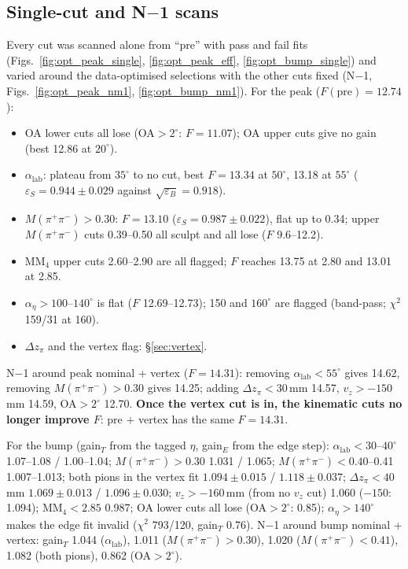 \documentclass[11pt,a4paper]{article}
\newcommand{\Mpipi}{\ensuremath{M(\pi^{+}\pi^{-})}\xspace}
\newcommand{\MMfour}{\ensuremath{\mathrm{MM}_4}\xspace}
\newcommand{\dzpi}{\ensuremath{\Delta z_\pi}\xspace}
\newcommand{\alab}{\ensuremath{\alpha_{\mathrm{lab}}}\xspace}
\newcommand{\aeta}{\ensuremath{\alpha_\eta}\xspace}
\newcommand{\vz}{\ensuremath{v_z}\xspace}
\begin{document}
\subsection{\texorpdfstring{Single-cut and N$-$1 scans}{Single-cut and N-1 scans}}
\label{sec:scans}
Every cut was scanned alone from ``pre'' with pass and fail fits (Figs.~\ref{fig:opt_peak_single},
\ref{fig:opt_peak_eff}, \ref{fig:opt_bump_single}) and varied around the data-optimised selections with the other
cuts fixed (N$-$1, Figs.~\ref{fig:opt_peak_nm1}, \ref{fig:opt_bump_nm1}). For the peak ($F(\mathrm{pre})=12.74$):
\begin{itemize}
\setlength{\itemsep}{0pt}
\item OA lower cuts all lose (OA$>2^\circ$: $F=11.07$); OA upper cuts give no gain (best 12.86 at
      $20^\circ$).
\item \alab: plateau from $35^\circ$ to no cut, best $F=13.34$ at $50^\circ$, 13.18 at $55^\circ$
      ($\varepsilon_S=0.944\pm0.029$ against $\sqrt{\varepsilon_B}=0.918$).
\item $\Mpipi>0.30$: $F=13.10$ ($\varepsilon_S=0.987\pm0.022$), flat up to 0.34; upper \Mpipi cuts 0.39--0.50 all sculpt
      and all lose ($F$ 9.6--12.2).
\item $\MMfour$ upper cuts 2.60--2.90 are all flagged; $F$ reaches 13.75 at 2.80 and 13.01 at 2.85.
\item $\aeta>100$--$140^\circ$ is flat ($F$ 12.69--12.73); 150 and $160^\circ$ are flagged (band-pass; $\chi^2$ 159/31 at 160).
\item \dzpi and the vertex flag: \S\ref{sec:vertex}.
\end{itemize}
N$-$1 around peak nominal + vertex ($F=14.31$): removing $\alab<55^\circ$ gives 14.62, removing $\Mpipi>0.30$ gives
14.25; adding $\dzpi<30$\,mm 14.57, $\vz>-150$\,mm 14.59, OA$>2^\circ$ 12.70. \textbf{Once the vertex cut is in, the
kinematic cuts no longer improve $F$}: pre + vertex has the same $F=14.31$.

For the bump (gain$_T$ from the tagged $\eta$, gain$_E$ from the edge step): $\alab<30$--$40^\circ$ 1.07--1.08 /
1.00--1.04; $\Mpipi>0.30$ 1.031 / 1.065; $\Mpipi<0.40$--0.41 1.007--1.013; both pions in the vertex fit
$1.094\pm0.015$ / $1.118\pm0.037$; $\dzpi<40$\,mm $1.069\pm0.013$ / $1.096\pm0.030$; $\vz>-160$\,mm (from no $\vz$ cut)
1.060 ($-150$: 1.094); $\MMfour<2.85$ 0.987; OA lower cuts all lose (OA$>2^\circ$: 0.85); $\aeta>140^\circ$ makes the edge
fit invalid ($\chi^2$ 793/120, gain$_T$ 0.76). N$-$1 around bump nominal + vertex: gain$_T$ 1.044 ($\alab$), 1.011
($\Mpipi>0.30$), 1.020 ($\Mpipi<0.41$), 1.082 (both pions), 0.862 (OA$>2^\circ$).
\end{document}
